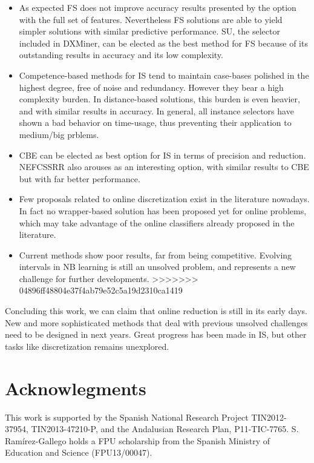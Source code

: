 \documentclass[preprint,12pt]{elsarticle}
\begin{document}
\begin{itemize}
	\item As expected FS does not improve accuracy results presented by the option with the full set of features. Nevertheless FS solutions are able to yield simpler solutions with similar predictive performance. SU, the selector included in DXMiner, can be elected as the best method for FS because of its outstanding results in accuracy and its low complexity.
	\item Competence-based methods for IS tend to maintain case-bases polished in the highest degree, free of noise and redundancy. However they bear a high complexity burden. In distance-based solutions, this burden is even heavier, and with similar results in accuracy. In general, all instance selectors have shown a bad behavior on time-usage, thus preventing their application to medium/big prblems.
	\item CBE can be elected as best option for IS in terms of precision and reduction. NEFCSSRR also arouses as an interesting option, with similar results to CBE but with far better performance.
	\item Few proposals related to online discretization exist in the literature nowadays. In fact no wrapper-based solution has been proposed yet for online problems, which may take advantage of the online classifiers already proposed in the literature. 
	\item Current methods show poor results, far from being competitive. Evolving intervals in NB learning is still an unsolved problem, and represents a new challenge for further developments.	
>>>>>>> 04896ff48804e37f4ab79e52c5a19d2310ca1419
\end{itemize}

Concluding this work, we can claim that online reduction is still in its early days. New and more sophisticated methods that deal with previous unsolved challenges need to be designed in next years. Great progress has been made in IS, but other tasks like discretization remains unexplored.

\section*{Acknowlegments}

This work is supported by the Spanish National Research Project TIN2012-37954, TIN2013-47210-P, and the Andalusian Research Plan, P11-TIC-7765. S. Ram\'irez-Gallego holds a FPU scholarship from the Spanish Ministry of Education and Science (FPU13/00047).
\end{document}
